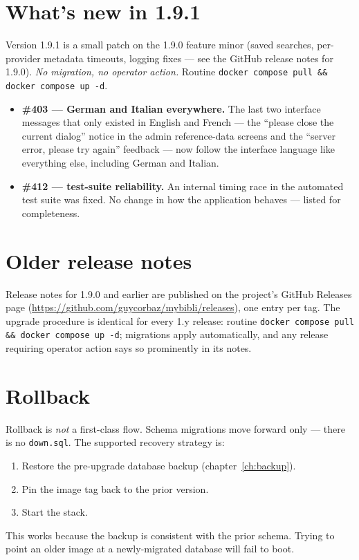 \section{What's new in 1.9.1}\label{sec:whats-new-1.9.1}

Version 1.9.1 is a small patch on the 1.9.0 feature minor (saved
searches, per-provider metadata timeouts, logging fixes — see the
GitHub release notes for 1.9.0). \emph{No migration, no operator
action.} Routine \texttt{docker compose pull \&\& docker compose
up -d}.

\begin{itemize}
  \item \textbf{\#403 \string— German and Italian everywhere.} The
        last two interface messages that only existed in English and
        French — the ``please close the current dialog'' notice in the
        admin reference-data screens and the ``server error, please
        try again'' feedback — now follow the interface language like
        everything else, including German and Italian.
  \item \textbf{\#412 \string— test-suite reliability.} An internal
        timing race in the automated test suite was fixed. No change
        in how the application behaves \string— listed for
        completeness.
\end{itemize}

\section{Older release notes}

Release notes for 1.9.0 and earlier are published on the project's
GitHub Releases page
(\url{https://github.com/guycorbaz/mybibli/releases}), one entry per
tag. The upgrade procedure is identical for every 1.y release: routine
\texttt{docker compose pull \&\& docker compose up -d}; migrations
apply automatically, and any release requiring operator action says so
prominently in its notes.

\section{Rollback}

Rollback is \emph{not} a first-class flow. Schema migrations move
forward only — there is no \texttt{down.sql}. The supported recovery
strategy is:

\begin{enumerate}
  \item Restore the pre-upgrade database backup
        (chapter~\ref{ch:backup}).
  \item Pin the image tag back to the prior version.
  \item Start the stack.
\end{enumerate}

This works because the backup is consistent with the prior schema.
Trying to point an older image at a newly-migrated database will
fail to boot.
